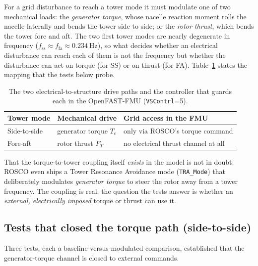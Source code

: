For a grid disturbance to reach a tower mode it must modulate one of two
mechanical loads: the \emph{generator torque}, whose nacelle reaction moment rolls
the nacelle laterally and bends the tower side to side; or the \emph{rotor
thrust}, which bends the tower fore and aft. The two first tower modes are nearly
degenerate in frequency
(\(f_{\mathrm{ss}}\approx f_{\mathrm{fa}}\approx\SI{0.234}{\hertz}\)), so what
decides whether an electrical disturbance can reach each of them is not the
frequency but whether the disturbance can act on torque (for SS) or on thrust
(for FA). Table~\ref{tab:rb-paths} states the mapping that the tests below probe.

\begin{table}[t]
  \centering
  \caption{The two electrical-to-structure drive paths and the controller that
  guards each in the OpenFAST-FMU (\texttt{VSContrl}=5).}
  \label{tab:rb-paths}
  \begin{tabular}{lll}
    \toprule
    Tower mode & Mechanical drive & Grid access in the FMU \\
    \midrule
    Side-to-side & generator torque \(T_e\) & only via ROSCO's torque command \\
    Fore-aft     & rotor thrust \(F_T\)      & no electrical thrust channel at all \\
    \bottomrule
  \end{tabular}
\end{table}

That the torque-to-tower coupling itself \emph{exists} in the model is not in
doubt: ROSCO even ships a Tower Resonance Avoidance mode (\texttt{TRA\_Mode}) that
deliberately modulates \emph{generator torque} to steer the rotor away from a
tower frequency. The coupling is real; the question the tests answer is whether an
\emph{external, electrically imposed} torque or thrust can use it.

\subsection{Tests that closed the torque path (side-to-side)}
\label{subsec:rb-torque}

Three tests, each a baseline-versus-modulated comparison, established that the
generator-torque channel is closed to external commands.

